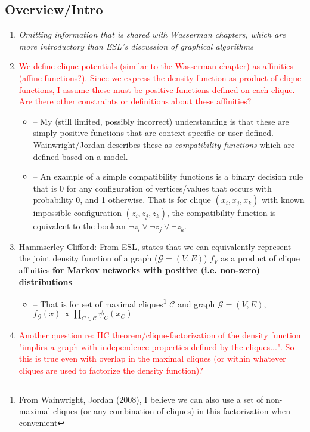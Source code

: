 \documentclass[11pt]{article}
\begin{document}
\subsection*{Overview/Intro}
\begin{enumerate}
    \item \textit{Omitting information that is shared with Wasserman chapters, which are more introductory than ESL's discussion of graphical algorithms}
    \item \textcolor{red}{\sout{We define clique potentials (similar to the Wasserman chapter) as affinities (affine functions?). Since we express the density function as product of clique functions, I assume these must be positive functions defined on each clique. Are there other constraints or definitions about these affinities?}}
    	\begin{itemize}
            \item -- My (still limited, possibly incorrect) understanding is that these are simply positive functions that are context-specific or user-defined. Wainwright/Jordan describes these as {\it compatibility functions} which are defined based on a model. 
    	    \item -- An example of a simple compatibility functions is a binary decision rule that is 0 for any configuration of vertices/values that occurs with probability 0, and 1 otherwise. That is for clique $(x_i, x_j, x_k)$ with known impossible configuration $(z_i, z_j, z_k)$, the compatibility function is equivalent to the boolean $\lnot z_i \lor \lnot z_j \lor \lnot z_k$.
        \end{itemize}
    \item Hammserley-Clifford: From ESL, states that we can equivalently represent the joint density function of a graph ($\mathcal{G} = (V,E)$) $f_V$ as a product of clique affinities {\bf for Markov networks with positive (i.e. non-zero) distributions}
    \begin{itemize}
        \item -- That is for set of maximal cliques\footnote{
            From Wainwright, Jordan (2008), I believe we can also use a set of non-maximal cliques (or any combination of cliques) in this factorization when convenient
            } $\mathcal{C}$ and graph $\mathcal{G} = (V, E)$, $f_\mathcal{G}(x) \propto \prod_{C \in \mathcal{C}}\psi_C (x_C)$
    \end{itemize}

    \item \textcolor{red}{Another question re: HC theorem/clique-factorization of the density function "implies a graph with independence properties defined by the cliques...". So this is true even with overlap in the maximal cliques (or within whatever cliques are used to factorize the density function)? }
        
    
\end{enumerate}
\end{document}
